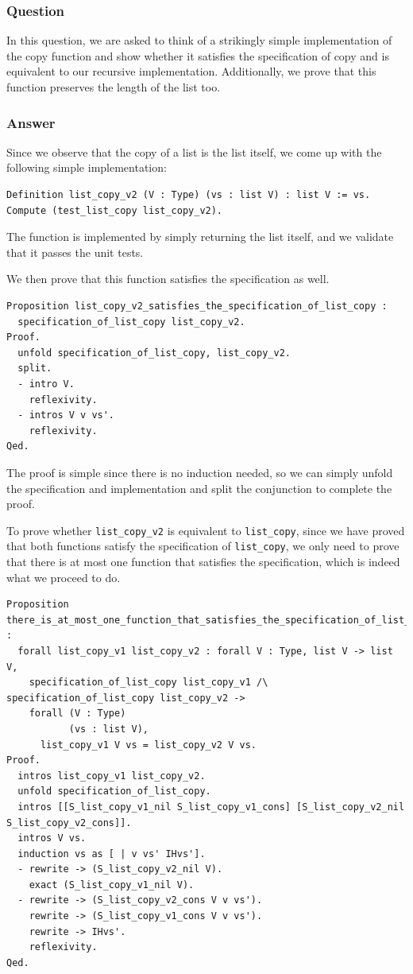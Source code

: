 \documentclass{article}
\begin{document}
\subsubsection{Question}
In this question, we are asked to think of a strikingly simple implementation of the copy function and show whether it satisfies the specification of copy and is equivalent to our recursive implementation. Additionally, we prove that this function preserves the length of the list too.

\subsubsection{Answer}
Since we observe that the copy of a list is the list itself, we come up with the following simple implementation:

\begin{lstlisting}
Definition list_copy_v2 (V : Type) (vs : list V) : list V := vs.
Compute (test_list_copy list_copy_v2).
\end{lstlisting}

The function is implemented by simply returning the list itself, and we validate that it passes the unit tests.

We then prove that this function satisfies the specification as well.

\begin{lstlisting}
Proposition list_copy_v2_satisfies_the_specification_of_list_copy :
  specification_of_list_copy list_copy_v2.
Proof.
  unfold specification_of_list_copy, list_copy_v2.
  split.
  - intro V.
    reflexivity.
  - intros V v vs'.
    reflexivity.
Qed.
\end{lstlisting}

The proof is simple since there is no induction needed, so we can simply unfold the specification and implementation and split the conjunction to complete the proof.

To prove whether \texttt{list\_copy\_v2} is equivalent to \texttt{list\_copy}, since we have proved that both functions satisfy the specification of \texttt{list\_copy}, we only need to prove that there is at most one function that satisfies the specification, which is indeed what we proceed to do.

\begin{lstlisting}
Proposition there_is_at_most_one_function_that_satisfies_the_specification_of_list_copy :
  forall list_copy_v1 list_copy_v2 : forall V : Type, list V -> list V,
    specification_of_list_copy list_copy_v1 /\ specification_of_list_copy list_copy_v2 ->
    forall (V : Type)
           (vs : list V),     
      list_copy_v1 V vs = list_copy_v2 V vs.
Proof.
  intros list_copy_v1 list_copy_v2.
  unfold specification_of_list_copy.
  intros [[S_list_copy_v1_nil S_list_copy_v1_cons] [S_list_copy_v2_nil S_list_copy_v2_cons]].
  intros V vs.
  induction vs as [ | v vs' IHvs'].
  - rewrite -> (S_list_copy_v2_nil V).
    exact (S_list_copy_v1_nil V).
  - rewrite -> (S_list_copy_v2_cons V v vs').
    rewrite -> (S_list_copy_v1_cons V v vs').
    rewrite -> IHvs'.
    reflexivity.
Qed.
\end{lstlisting}
\end{document}
